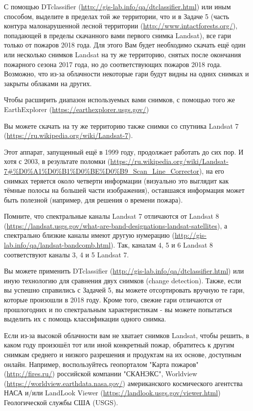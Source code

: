 
С помощью DTclassifier (\url{http://gis-lab.info/qa/dtclassifier.html}) или иным способом, выделите в 
пределах той же территории, 
что и в Задаче 5 (часть контура малонарушенной лесной территории (\url{http://www.intactforests.org/}), 
попадающей в пределы скачанного вами первого снимка Landsat), все гари только от пожаров 2018 года. Для этого Вам будет необходимо скачать ещё один или несколько снимков Landsat на ту же территорию, снятых после окончания пожарного сезона 2017 года, но до соответствующих пожаров 2018 года. Возможно, что из-за облачности некоторые гари будут видны на одних снимках и закрыты облаками на других.

Чтобы расширить диапазон используемых вами снимков, с помощью того же EarthExplorer (\url{https://earthexplorer.usgs.gov/}) 

Вы можете скачать на ту же территорию также снимки со спутника Landsat 7 (\url{https://ru.wikipedia.org/wiki/Landsat-7}). 

Этот аппарат, запущенный ещё в 1999 году, продолжает работать до сих пор. И хотя с 2003, в результате поломки (\url{https://ru.wikipedia.org/wiki/Landsat-7#%D0%A1%D0%B1%D0%BE%D0%B9_Scan_Line_Corrector}), на его снимках теряется около четверти информации (визуально это выглядит как тёмные полосы на большей части изображения), оставшаяся информация может быть полезной (например, для решения о времени пожара).

Помните, что спектральные каналы Landsat 7 отличаются от Landsat 8 (\url{https://landsat.usgs.gov/what-are-band-designations-landsat-satellites}), а спектрально близкие каналы имеют другую нумерацию \linebreak (\url{http://gis-lab.info/qa/landsat-bandcomb.html}). Так, каналам 4, 5 и 6 Landsat 8 соответствуют каналы 3, 4 и 5 Landsat 7. 

Вы можете применить DTclassifier (\url{http://gis-lab.info/qa/dtclassifier.html}) или иную технологию для сравнения двух снимков (change detection). Также, если вы успешно справились с Задачей 5, вы можете отсортировать вручную те гари, которые произошли в 2018 году. Кроме того, свежие гари отличаются от прошлогодних и по спектральным характеристикам - вы можете попытаться выделить их с помощь классификации одного снимка.

Если из-за высокой облачности вам не хватает снимков Landsat, чтобы решить, в каком году произошёл 
тот или иной конкретный пожар, обратитесь к другим снимкам среднего и низкого разрешения и продуктам 
на их основе, доступным онлайн. Например, воспользуйтесь геопорталом "Карта пожаров" (\url{http://fires.ru/}) 
российской компании "СКАНЭКС", Worldview (\url{https://worldview.earthdata.nasa.gov/}) американского 
космического агентства НАСА и/или LandLook Viewer (\url{https://landlook.usgs.gov/viewer.html}) Геологической службы США (USGS). 

